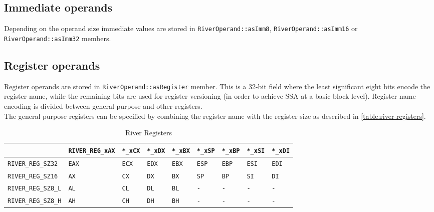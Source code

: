 \documentclass[12pt]{report}
\begin{document}
\subsection{Immediate operands}
\label{ssec:immediate-operands}
Depending on the operand size immediate values are stored in \texttt{RiverOperand::asImm8}, \texttt{RiverOperand::asImm16} or \texttt{RiverOperand::asImm32} members.\\
\subsection{Register operands}
\label{ssec:register-operands}
Register operands are stored in \texttt{RiverOperand::asRegister} member. This is a 32-bit field where the least significant eight bits encode the register name, while the remaining bits are used for register versioning (in order to achieve SSA at a basic block level). Register name encoding is divided between general purpose and other registers.\\
\newline
The general purpose registers can be specified by combining the register name with the register size as described in \autoref{table:river-registers}.\\
\begin{table}[H]
	\begin{tabular}{| p{3.6cm} | p{3.2cm} | p{1cm} | p{1cm} | p{1cm} | p{1cm} | p{1cm} | p{1cm} | p{1cm} |}
		\hline
		& \texttt{RIVER_REG_xAX}  & \texttt{*_xCX}  & \texttt{*_xDX}  & \texttt{*_xBX}  & \texttt{*_xSP}  & \texttt{*_xBP}  & \texttt{*_xSI}  & \texttt{*_xDI}\\ \hline
		\texttt{RIVER_REG_SZ32}  & \texttt{EAX}  & \texttt{ECX}  & \texttt{EDX}  & \texttt{EBX}  & \texttt{ESP}  & \texttt{EBP}  & \texttt{ESI}  & \texttt{EDI}\\ \hline
		\texttt{RIVER_REG_SZ16}  & \texttt{AX}  & \texttt{CX}  & \texttt{DX}  & \texttt{BX}  & \texttt{SP}  & \texttt{BP}  & \texttt{SI}  & \texttt{DI}\\ \hline
		\texttt{RIVER_REG_SZ8_L}  & \texttt{AL}  & \texttt{CL}  & \texttt{DL}  & \texttt{BL}  & \texttt{-}  & \texttt{-}  & \texttt{-}  & \texttt{-}\\ \hline
		\texttt{RIVER_REG_SZ8_H}  & \texttt{AH}  & \texttt{CH}  & \texttt{DH}  & \texttt{BH}  & \texttt{-}  & \texttt{-}  & \texttt{-}  & \texttt{-}\\ \hline
	\end{tabular}
	\caption{River Registers}
	\label{table:river-registers}
\end{table}
\end{document}
